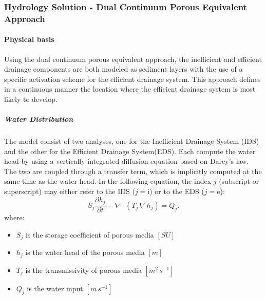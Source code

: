 
\subsubsection{Hydrology Solution - Dual Continuum Porous Equivalent Approach} \label{sec:using-issm-capabilities-hydrology-dc}
\paragraph{Physical basis}
Using the dual continuum porous equivalent approach, the inefficient and efficient drainage components are both modeled as sediment layers with the use of a specific activation scheme for the efficient drainage system. This approach defines in a continuous manner the location where the efficient drainage system is most likely to develop.

\subparagraph{Water Distribution}
The model consist of two analyses, one for the Inefficient Drainage System (IDS) and the other for the Efficient Drainage System(EDS). Each compute the water head by using a vertically integrated diffusion equation based on Darcy's law. The two are coupled through a transfer term, which is implicitly computed at the same time as the water head. In the following equation, the index $j$
(subscript or superscript) may either refer to the IDS ($j=\text{i}$) or to the EDS ($j=\text{e}$):
\begin{equation}\label{eq:dif_int}
	S_j\frac{\partial h_j }{\partial t } - \nabla \cdot \left(T_j\, \nabla\,h_j \right) = Q_j.
\end{equation}
where:
\begin{itemize}
	\item $S_j$ is the storage coefficient of porous media $[SU]$
	\item $h_j$ is the water head of the porous media $[m]$
	\item $T_j$ is the transmissivity of porous media $[m^2\,s^{-1}]$
	\item $Q_j$ is the water input $[m\,s^{-1}]$
\end{itemize}

